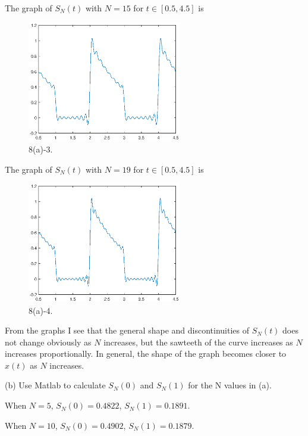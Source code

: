 \documentclass[a4paper]{article}
\begin{document}
The graph of $S_N(t)$ with $N=15$ for $t\in[0.5,4.5]$ is
\begin{figure}[H]
    \begin{center}
        \includegraphics[width=0.6\textwidth]{8(a)-3.eps}
    \end{center}
    \caption{8(a)-3.}
\end{figure}

The graph of $S_N(t)$ with $N=19$ for $t\in[0.5,4.5]$ is
\begin{figure}[H]
    \begin{center}
        \includegraphics[width=0.6\textwidth]{8(a)-4.eps}
    \end{center}
    \caption{8(a)-4.}
\end{figure}

From the graphs I see that the general shape and discontinuities of $S_N(t)$ does not change obviously as $N$ increases, but the sawteeth of the curve increases as $N$ increases proportionally. In general, the shape of the graph becomes closer to $x(t)$ as $N$ increases.

(b) Use Matlab to calculate $S_N(0)$ and $S_N(1)$ for the N values in (a).

When $N=5$, $S_N(0)=0.4822$, $S_N(1)=0.1891$.

When $N=10$, $S_N(0)=0.4902$, $S_N(1)=0.1879$.
\end{document}

